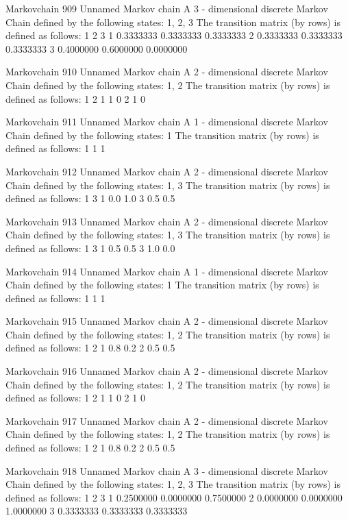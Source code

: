 \documentclass[
  nojss]{jss}
\begin{document}
\begin{CodeChunk}
\begin{CodeOutput}
Markovchain  909 
Unnamed Markov chain 
 A  3 - dimensional discrete Markov Chain defined by the following states: 
 1, 2, 3 
 The transition matrix  (by rows)  is defined as follows: 
          1         2         3
1 0.3333333 0.3333333 0.3333333
2 0.3333333 0.3333333 0.3333333
3 0.4000000 0.6000000 0.0000000

Markovchain  910 
Unnamed Markov chain 
 A  2 - dimensional discrete Markov Chain defined by the following states: 
 1, 2 
 The transition matrix  (by rows)  is defined as follows: 
  1 2
1 1 0
2 1 0

Markovchain  911 
Unnamed Markov chain 
 A  1 - dimensional discrete Markov Chain defined by the following states: 
 1 
 The transition matrix  (by rows)  is defined as follows: 
  1
1 1

Markovchain  912 
Unnamed Markov chain 
 A  2 - dimensional discrete Markov Chain defined by the following states: 
 1, 3 
 The transition matrix  (by rows)  is defined as follows: 
    1   3
1 0.0 1.0
3 0.5 0.5

Markovchain  913 
Unnamed Markov chain 
 A  2 - dimensional discrete Markov Chain defined by the following states: 
 1, 3 
 The transition matrix  (by rows)  is defined as follows: 
    1   3
1 0.5 0.5
3 1.0 0.0

Markovchain  914 
Unnamed Markov chain 
 A  1 - dimensional discrete Markov Chain defined by the following states: 
 1 
 The transition matrix  (by rows)  is defined as follows: 
  1
1 1

Markovchain  915 
Unnamed Markov chain 
 A  2 - dimensional discrete Markov Chain defined by the following states: 
 1, 2 
 The transition matrix  (by rows)  is defined as follows: 
    1   2
1 0.8 0.2
2 0.5 0.5

Markovchain  916 
Unnamed Markov chain 
 A  2 - dimensional discrete Markov Chain defined by the following states: 
 1, 2 
 The transition matrix  (by rows)  is defined as follows: 
  1 2
1 1 0
2 1 0

Markovchain  917 
Unnamed Markov chain 
 A  2 - dimensional discrete Markov Chain defined by the following states: 
 1, 2 
 The transition matrix  (by rows)  is defined as follows: 
    1   2
1 0.8 0.2
2 0.5 0.5

Markovchain  918 
Unnamed Markov chain 
 A  3 - dimensional discrete Markov Chain defined by the following states: 
 1, 2, 3 
 The transition matrix  (by rows)  is defined as follows: 
          1         2         3
1 0.2500000 0.0000000 0.7500000
2 0.0000000 0.0000000 1.0000000
3 0.3333333 0.3333333 0.3333333


\end{CodeOutput}
\end{CodeChunk}
\end{document}

